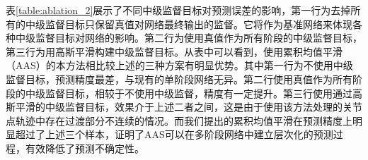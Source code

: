 \begin{table}[ht]
    \begin{center}
    \end{center}
    \caption{不同中级监督目标对预测误差的影响}
    \label{table:ablation_2}
    \end{table}

表\ref{table:ablation_2}展示了不同中级监督目标对预测误差的影响，第一行为去掉所有的中级监督目标只保留真值对网络最终输出的监督。它将作为基准网络来体现各种中级监督目标对网络的影响。第二行为使用真值作为所有阶段的中级监督目标，第三行为用高斯平滑构建中级监督目标。从表中可以看到，使用累积均值平滑（AAS）的本方法相比较上述的三种方案有明显优势。其中第一行为不使用中级监督目标，预测精度最差，与现有的单阶段网络无异。第二行使用真值作为所有阶段的中级监督目标，相较于不使用中级监督，精度有一定提升。第三行使用通过高斯平滑的中级监督目标，效果介于上述二者之间，这是由于使用该方法处理的关节点轨迹中存在过渡部分不连续的情况。而我们提出的累积均值平滑在预测精度上明显超过了上述三个样本，证明了AAS可以在多阶段网络中建立层次化的预测过程，有效降低了预测不确定性。


